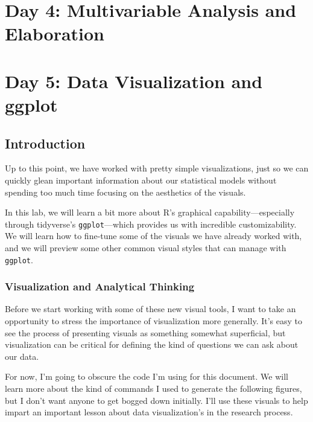 \documentclass[
  letterpaper,
  DIV=11,
  numbers=noendperiod]{scrreprt}
\begin{document}
\part{Day 4: Multivariable Analysis and Elaboration}

\part{Day 5: Data Visualization and ggplot}

\chapter*{Introduction}\label{introduction}


Up to this point, we have worked with pretty simple visualizations, just
so we can quickly glean important information about our statistical
models without spending too much time focusing on the aesthetics of the
visuals.

In this lab, we will learn a bit more about R's graphical
capability---especially through tidyverse's \texttt{ggplot}---which
provides us with incredible customizability. We will learn how to
fine-tune some of the visuals we have already worked with, and we will
preview some other common visual styles that can manage with
\texttt{ggplot}.

\section*{Visualization and Analytical
Thinking}\label{visualization-and-analytical-thinking}


Before we start working with some of these new visual tools, I want to
take an opportunity to stress the importance of visualization more
generally. It's easy to see the process of presenting visuals as
something somewhat superficial, but visualization can be critical for
defining the kind of questions we can ask about our data.

For now, I'm going to obscure the code I'm using for this document. We
will learn more about the kind of commands I used to generate the
following figures, but I don't want anyone to get bogged down initially.
I'll use these visuals to help impart an important lesson about data
visualization's in the research process.
\end{document}
